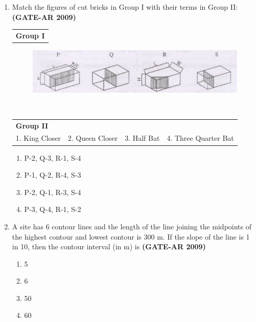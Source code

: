 \documentclass[a4paper,10pt]{article}
\begin{document}
\begin{enumerate}
    \item Match the figures of cut bricks in Group I with their terms in Group II: \hfill \textbf{(GATE-AR 2009)} \\
    \begin{tabular}{ l }
	\textbf{Group I} \\
	\end{tabular}
	\begin{figure}[h!]
        \centering
        \includegraphics[width=0.5\linewidth]{figs/img_01.jpg}
        \label{fig:Img01}
    \end{figure} \\
	\begin{tabular}{ l l l l }
	\textbf{Group II} & & & \\
	1. King Closer & 2. Queen Closer & 3. Half Bat & 4. Three Quarter Bat \\
	\end{tabular}
	\begin{multicols}{2}
	\begin{enumerate}
        \item P-2, Q-3, R-1, S-4
        \item P-1, Q-2, R-4, S-3
        \item P-2, Q-1, R-3, S-4
        \item P-3, Q-4, R-1, S-2
    \end{enumerate}
	\end{multicols}

    \item A site has 6 contour lines and the length of the line joining the midpoints of the highest contour and lowest contour is 300 m. If the slope of the line is 1 in 10, then the contour interval (in m) is \hfill \textbf{(GATE-AR 2009)}
    \begin{multicols}{4}
	\begin{enumerate}
        \item 5
        \item 6
        \item 50
        \item 60
    \end{enumerate}
	\end{multicols}
	

\end{enumerate}
\end{document}
